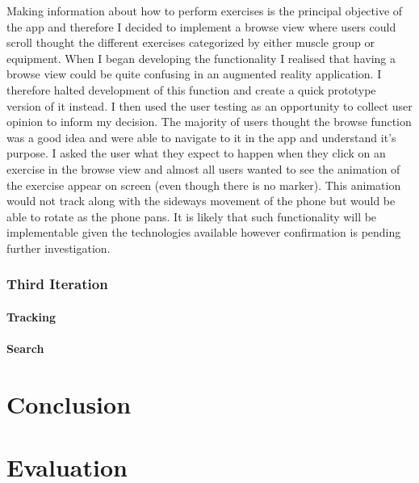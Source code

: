 \documentclass{l4proj}
\begin{document}
Making information about how to perform exercises is the principal objective of the app and therefore I decided to implement a browse view where users could scroll thought the different exercises categorized by either muscle group or equipment. When I began developing the functionality I realised that having a browse view could be quite confusing in an augmented reality application. I therefore halted development of this function and create a quick prototype version of it instead. I then used the user testing as an opportunity to collect user opinion to inform my decision. The majority of users thought the browse function was a good idea and were able to navigate to it in the app and understand it's purpose. I asked the user what they expect to happen when they click on an exercise in the browse view and almost all users wanted to see the animation of the exercise appear on screen (even though there is no marker). This animation would not track along with the sideways movement of the phone but would be able to rotate as the phone pans. It is likely that such functionality will be implementable given the technologies available however confirmation is pending further investigation. 

\subsection{Third Iteration}
\subsubsection{Tracking}
\subsubsection{Search}


\chapter{Conclusion}

\chapter{Evaluation}
\end{document}
